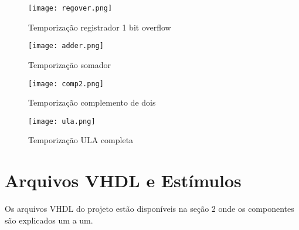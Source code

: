 \documentclass[a4paper]{article}
\begin{document}
\begin{figure}[H]
\centering
\texttt{[image: regover.png]}
\caption{Temporização registrador 1 bit overflow \label{Figura 3}}
\end{figure}
\smallskip

\begin{figure}[H]
\centering
\texttt{[image: adder.png]}
\caption{Temporização somador \label{Figura 4}}
\end{figure}
\smallskip

\begin{figure}[H]
\centering
\texttt{[image: comp2.png]}
\caption{Temporização complemento de dois \label{Figura 5}}
\end{figure}
\smallskip

\begin{figure}[H]
\centering
\texttt{[image: ula.png]}
\caption{Temporização ULA completa \label{Figura 6}}
\end{figure}
\smallskip

\section{\textbf{Arquivos VHDL e Estímulos}}

Os arquivos VHDL do projeto estão disponíveis na seção 2 onde os componentes são explicados um a um.

\bigskip
\end{document}
